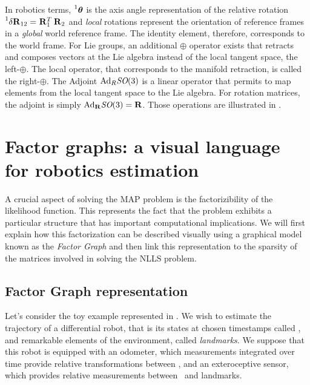 In robotics terms, $\prescript{1}{}{{\bm \theta}}$ is the axis angle representation of the relative rotation $\prescript{1}{}{\delta {\bf R}}_{12} = \prescript{}{}{{\bf R}}_{1}^T\prescript{}{}{{\bf R}}_{2}$ and
\textit{local} rotations represent the orientation of reference frames in a \textit{global} world reference frame. The identity element, therefore, corresponds 
to the world frame. For Lie groups, an additional $\oplus$ operator exists that retracts and composes vectors at the Lie algebra instead of
the local tangent space, the left-$\oplus$. The local operator, that corresponds to the manifold retraction, is called the right-$\oplus$. 
The Adjoint $\text{Ad}_{R}\textit{SO}(3)$ is a linear operator that permits to map elements from the local tangent space to the Lie algebra. 
For rotation matrices, the adjoint is simply $\text{Ad}_{{\bf R}}\textit{SO}(3)={\bf R}$. Those operations are illustrated in .


%
%
%
\section{Factor graphs: a visual language for robotics estimation}
\label{sec:factor_graphs}

A crucial aspect of solving the MAP problem is the factorizibility of the likelihood function. This represents the fact that the problem
exhibits a particular structure that has important computational implications. We will first explain how this factorization can be described 
visually using a graphical model known as the \textit{Factor Graph} and then link this representation to the sparsity of the matrices involved
in solving the NLLS problem.


\subsection{Factor Graph representation}
Let's consider the toy example represented in . 
We wish to estimate the trajectory of a differential robot, that is its states at chosen timestamps called \textit{\keyframes}, and remarkable elements 
of the environment, called \textit{landmarks}. We suppose that this robot is equipped with an odometer, which measurements integrated over time provide relative 
transformations between \keyframes, and an exteroceptive sensor, which provides relative measurements between \keyframes~and landmarks.

